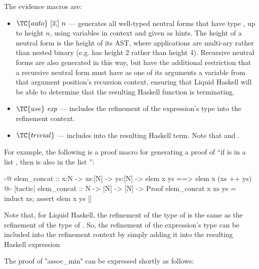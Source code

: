 \begin{itemize}
  The evidence macros are:
  \begin{itemize}
    \item
    $\TC{auto} ~ [\overline{\textit{x} ,}] ~ n$ --- generates all well-typed neutral forms that have type , up to height $n$, using variables in context and given as hints. 
    The height of a neutral form is the height of its AST, where applications are multi-ary rather than nested binary (e.g.  has height 2 rather than height 4).
    Recursive neutral forms are also generated in this way, but have the additional restriction that a recursive neutral form must have as one of its arguments a variable from that argument position's recursion context, ensuring that Liquid Haskell will be able to determine that the resulting Haskell function is terminating.
    \item $\TC{use} ~ \textit{exp}$ --- includes the refinement of the expression's type into the refinement context.
    \item $\TC{trivial}$ --- includes  into the resulting Haskell term. Note that  and .
  \end{itemize}
\end{itemize}

For example, the following is a proof macro for generating a proof of ``if  is in a list , then  is also in the list '':
\begin{code}
  {-@ 
  elem_concat ::
    x:N -> xs:[N] -> ys:[N] ->
    {elem x ys ==> elem x (xs ++ ys)}
  @-}
  [tactic|
  elem_concat :: N -> [N] -> [N] -> Proof
  elem_concat x xs ys =
    induct xs;
    assert {elem x ys}
  |]
\end{code}


% 
% 

Note that, for Liquid Haskell, the refinement of the type of  is the same as the refinement of the type of .
So, the refinement of the expression's type can be included into the refinement context by simply adding it into the resulting Haskell expression

 The proof of "assoc\_min" can be expressed shortly as follows:
  
